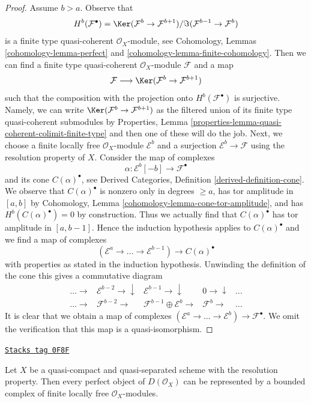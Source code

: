 \begin{proof}
\medskip\noindent
Assume $b > a$. Observe that
$$
H^b(\mathcal{F}^\bullet) =
\Ker(\mathcal{F}^b \to \mathcal{F}^{b + 1})/
\Im(\mathcal{F}^{b - 1} \to \mathcal{F}^b)
$$
is a finite type quasi-coherent $\mathcal{O}_X$-module, see
Cohomology, Lemmas \ref{cohomology-lemma-perfect} and
\ref{cohomology-lemma-finite-cohomology}. Then we can find a finite type
quasi-coherent $\mathcal{O}_X$-module $\mathcal{F}$ and a map
$$
\mathcal{F} \longrightarrow
\Ker(\mathcal{F}^b \to \mathcal{F}^{b + 1})
$$
such that the composition with the projection onto
$H^b(\mathcal{F}^\bullet)$ is surjective.
Namely, we can write $\Ker(\mathcal{F}^b \to \mathcal{F}^{b + 1})$
as the filtered union of its finite type quasi-coherent submodules by
Properties, Lemma \ref{properties-lemma-quasi-coherent-colimit-finite-type}
and then one of these will do the job.
Next, we choose a finite locally free $\mathcal{O}_X$-module
$\mathcal{E}^b$ and a surjection $\mathcal{E}^b \to \mathcal{F}$ using
the resolution property of $X$. Consider the map of complexes
$$
\alpha : \mathcal{E}^b[-b] \to \mathcal{F}^\bullet
$$
and its cone $C(\alpha)^\bullet$, see
Derived Categories, Definition \ref{derived-definition-cone}.
We observe that $C(\alpha)^\bullet$ is nonzero only in degrees
$\geq a$, has tor amplitude in $[a, b]$ by
Cohomology, Lemma \ref{cohomology-lemma-cone-tor-amplitude},
and has $H^b(C(\alpha)^\bullet) = 0$ by construction.
Thus we actually find that $C(\alpha)^\bullet$ has tor amplitude
in $[a, b - 1]$. Hence the induction hypothesis applies to
$C(\alpha)^\bullet$ and we find a map of complexes
$$
(\mathcal{E}^a \to \ldots \to \mathcal{E}^{b - 1})
\longrightarrow
C(\alpha)^\bullet
$$
with properties as stated in the induction hypothesis. Unwinding
the definition of the cone this gives a commutative diagram
$$
\begin{array}{ccccc}\ldots \longrightarrow & \mathcal{E}^{b - 2} \longrightarrow\downarrow & \mathcal{E}^{b - 1} \longrightarrow\downarrow & 0 \longrightarrow\downarrow & \ldots \\ \ldots \longrightarrow & \mathcal{F}^{b - 2} \longrightarrow & \mathcal{F}^{b - 1} \oplus \mathcal{E}^b \longrightarrow & \mathcal{F}^b \longrightarrow & \ldots\end{array}
$$
It is clear that we obtain a map of complexes
$(\mathcal{E}^a \to \ldots \to \mathcal{E}^b) \to \mathcal{F}^\bullet$.
We omit the verification that this map is a quasi-isomorphism.
\end{proof}

\begin{lemma}
\label{perfect-lemma-resolution-property-perfect-complex}
\href{https://stacks.math.columbia.edu/tag/0F8F}{\texttt{Stacks tag 0F8F}}

Let $X$ be a quasi-compact and quasi-separated scheme with the
resolution property. Then every perfect object of $D(\mathcal{O}_X)$
can be represented by a bounded complex of finite locally free
$\mathcal{O}_X$-modules.
\end{lemma}

